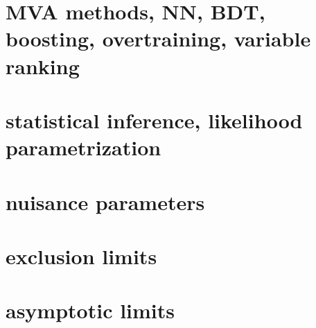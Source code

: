 \section{ MVA methods, NN, BDT, boosting, overtraining, variable ranking  }
\section{statistical inference, likelihood parametrization}
\section{ nuisance parameters}
\section{exclusion limits }
\section{asymptotic limits }












